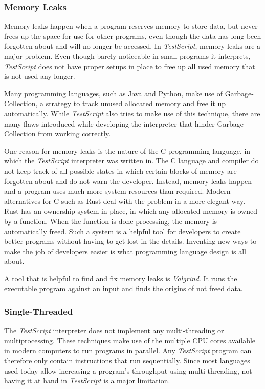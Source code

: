 \documentclass[12pt,a4paper]{article}
\newcommand{\name}{\emph{TestScript}}
\begin{document}
\subsubsection{Memory Leaks}\label{memleaks}
Memory leaks happen when a program reserves memory to store data, but
never frees up the space for use for other programs, even though the data
has long been forgotten about and will no longer be accessed.
In \name{}, memory leaks are a major problem. Even though barely noticeable in small
programs it interprets, \name{} does not have proper setups in place to free up
all used memory that is not used any longer.

Many programming languages, such as Java and Python,
make use of Garbage-Collection, a strategy to track unused allocated memory and
free it up automatically. While \name{} also tries to make use of this technique,
there are many flaws introduced while developing the interpreter that hinder 
Garbage-Collection from working correctly.

One reason for memory leaks is the nature of the
C programming language, in which the \name{} interpreter was written in. The C language and
compiler do not keep track of all possible states in which certain blocks of memory are
forgotten about and do not warn the developer. Instead, memory leaks happen and a program
uses much more system resources than required.
Modern alternatives for C such as Rust deal with the problem in a more elegant way. 
Rust has an ownership system in place,
in which any allocated memory is owned by a function. When the function
is done processing, the memory is automatically freed. Such a system
is a helpful tool for developers to create better programs without having to get
lost in the details.
Inventing new ways to make the job of developers easier is what programming
language design is all about.

A tool that is helpful to find and fix memory leaks is \emph{Valgrind}. It runs
the executable program against an input and finds the origins of not freed data.

\subsubsection{Single-Threaded}
The \name{} interpreter does not implement any multi-threading or multiprocessing.
These techniques make use of the multiple CPU cores available in modern computers
to run programs in parallel.
Any \name{} program can therefore
only contain instructions that run sequentially.
Since most languages used today allow increasing a
program's throughput using multi-threading, not having it at hand in \name{}
is a major limitation.
\end{document}

